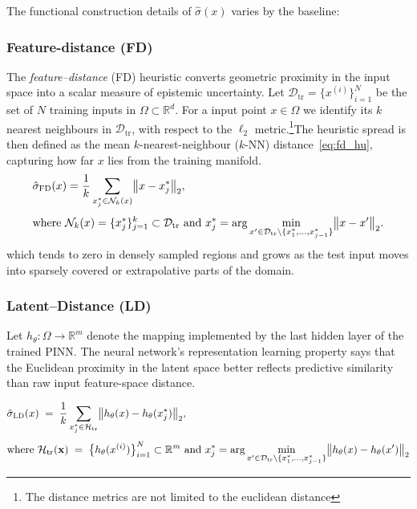 \documentclass[preprint,12pt]{elsarticle}
\begin{document}
The functional construction details of $\hat\sigma(x)$ varies by the baseline:



\subsubsection{Feature-distance (FD)}
\label{sec:sub:feature_distance}
    The \emph{feature–distance} (FD) heuristic converts geometric
    proximity in the input space into a scalar measure of epistemic
    uncertainty. Let $\mathcal D_{\mathrm{tr}}=\{x^{(i)}\}_{i=1}^{N}$ be the set of
    $N$ training inputs in $\Omega\subset\mathbb R^{d}$. For a input
    point $x\in\Omega$ we identify its $k$ nearest neighbours in
    $\mathcal D_{\mathrm{tr}}$, with respect to the $\ell_2$ metric.\footnote{The distance metrics are not limited to the 
    euclidean distance}The heuristic spread is then defined as the mean $k$-nearest-neighbour ($k$-NN) distance~\eqref{eq:fd_hu}, capturing how far $x$ lies from the training manifold.
    \begin{equation}
    \begin{aligned}
    &\hat\sigma_{\textsc{FD}}(x)
      = \frac{1}{k}\sum_{x_j^\ast\in\mathcal N_k(x)}
         \bigl\lVert x - x_j^\ast \bigr\rVert_{2}, \\[3pt]
     &\text{where }
     \mathcal N_k(x) = \{x_j^\ast\}_{j=1}^{k} \subset \mathcal D_{\mathrm{tr}} 
     \text{ and }
     x_j^\ast = \arg\min_{x'\in\mathcal D_{\mathrm{tr}}\setminus\{x_1^\ast,\dots,x_{j-1}^\ast\}}
         \bigl\lVert x - x'\bigr\rVert_{2}.
    \end{aligned}
    \label{eq:fd_hu}
    \end{equation}
    \noindent
    which tends to zero in densely sampled regions and grows as the test input moves into sparsely covered or extrapolative parts of the domain.
    
\subsubsection{Latent–Distance (LD)}
\label{sec:sub:latent_distance}
Let $h_{\theta}\colon\Omega\to\mathbb{R}^{m}$ denote the mapping implemented by the last hidden layer of the trained
PINN\@. The neural network's representation learning property says that the Euclidean proximity in the latent space better reflects predictive similarity than raw input feature-space distance.

\begin{equation}
\begin{aligned}
    &\hat{\sigma}_{\textsc{LD}}(x) \;=\; \frac{1}{k}\sum_{x_{j}^\ast \in \mathcal{H}_{\mathrm{tr}}}\bigl\lVert h_{\theta}(x) - h_{\theta}(x_{j}^{\ast}) \bigr\rVert_{2}, \\[3pt]
    &\text{where }
    \mathcal{H}_{\mathrm{tr}}(\mathbf x)
    \;=\; \bigl\{h_{\theta}(x^{(i)})\bigr\}_{i=1}^{N}\subset\mathbb{R}^{m}
    \text{ and }
    x_j^\ast = \arg\min_{x'\in\mathcal D_{\mathrm{tr}}\setminus\{x_1^\ast,\dots,x_{j-1}^\ast\}}
    \bigl\lVert h_\theta(x) - h_\theta(x')\bigr\rVert_{2}
\end{aligned}
\label{eq:ld_hu}
\end{equation}
\end{document}
